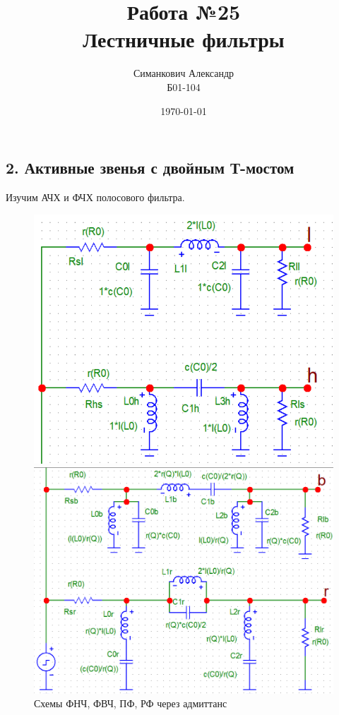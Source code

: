 \documentclass[12pt,a4paper]{article}
\title{Работа №25\\ Лестничные фильтры}
\author{Симанкович Александр \\ Б01-104}
\date{\today}
\begin{document}
	\maketitle	
	
	\subsection*{2. Активные звенья с двойным Т-мостом}
	
	Изучим АЧХ и ФЧХ полосового фильтра.

	\begin{figure}[H]
		\centering
		\begin{minipage}[b]{.5\textwidth}
			\includegraphics[width=0.9\linewidth]{res/adm3p_lh.png}
		\end{minipage}%
		\begin{minipage}[b]{.5\textwidth}
			\includegraphics[width=0.9\linewidth]{res/adm3p_br.png}
		\end{minipage}
		\caption*{Схемы ФНЧ, ФВЧ, ПФ, РФ через адмиттанс}
	\end{figure}
\end{document}
